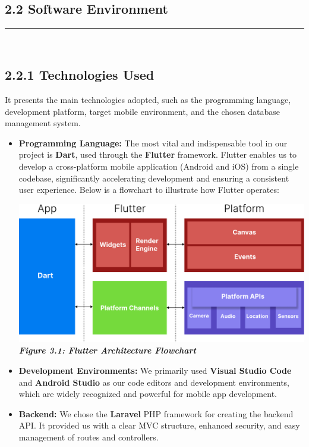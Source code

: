 \documentclass[12pt]{report}
\begin{document}
\subsection*{2.2 Software Environment}
\vspace{-0.3cm}
\rule{0.40\linewidth}{0.5pt} \\[-1.2cm]
\subsection*{2.2.1 Technologies Used}
It presents the main technologies adopted, such as the programming language, development platform, target mobile environment, and the chosen database management system.

\begin{itemize}
    \item \textbf{Programming Language:} The most vital and indispensable tool in our project is \textbf{Dart}, used through the \textbf{Flutter} framework. Flutter enables us to develop a cross-platform mobile application (Android and iOS) from a single codebase, significantly accelerating development and ensuring a consistent user experience. Below is a flowchart to illustrate how Flutter operates:  
    \begin{center}
    \includegraphics[width=\linewidth]{images/FlutterDiagram@2x.pdf}
	\textit{\textbf{Figure 3.1: Flutter Architecture Flowchart}}
    \end{center}


    \item \textbf{Development Environments:} We primarily used \textbf{Visual Studio Code} and \textbf{Android Studio} as our code editors and development environments, which are widely recognized and powerful for mobile app development.

    \item \textbf{Backend:} We chose the \textbf{Laravel} PHP framework for creating the backend API. It provided us with a clear MVC structure, enhanced security, and easy management of routes and controllers.


\end{itemize}
\end{document}
